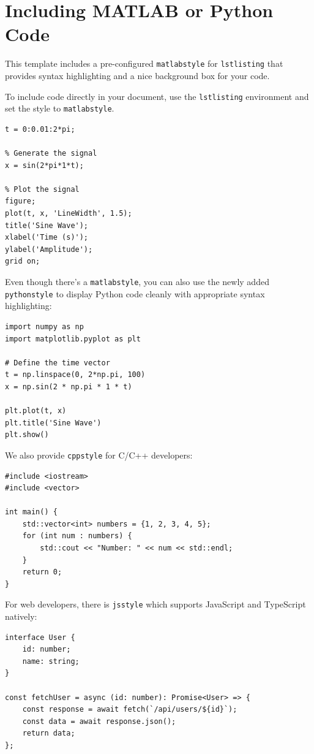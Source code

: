 \section{Including MATLAB or Python Code}

This template includes a pre-configured \texttt{matlabstyle} for \texttt{lstlisting} that provides syntax highlighting and a nice background box for your code.

To include code directly in your document, use the \texttt{lstlisting} environment and set the style to \texttt{matlabstyle}.

\begin{lstlisting}[style=matlabstyle, caption={A simple MATLAB script to plot a sine wave.}]
% Define the time vector
t = 0:0.01:2*pi;

% Generate the signal
x = sin(2*pi*1*t);

% Plot the signal
figure;
plot(t, x, 'LineWidth', 1.5);
title('Sine Wave');
xlabel('Time (s)');
ylabel('Amplitude');
grid on;
\end{lstlisting}

Even though there's a \texttt{matlabstyle}, you can also use the newly added \texttt{pythonstyle} to display Python code cleanly with appropriate syntax highlighting:

\begin{lstlisting}[style=pythonstyle, caption={A simple Python script.}]
import numpy as np
import matplotlib.pyplot as plt

# Define the time vector
t = np.linspace(0, 2*np.pi, 100)
x = np.sin(2 * np.pi * 1 * t)

plt.plot(t, x)
plt.title('Sine Wave')
plt.show()
\end{lstlisting}

We also provide \texttt{cppstyle} for C/C++ developers:

\begin{lstlisting}[style=cppstyle, caption={A simple C++ program.}]
#include <iostream>
#include <vector>

int main() {
    std::vector<int> numbers = {1, 2, 3, 4, 5};
    for (int num : numbers) {
        std::cout << "Number: " << num << std::endl;
    }
    return 0;
}
\end{lstlisting}

For web developers, there is \texttt{jsstyle} which supports JavaScript and TypeScript natively:

\begin{lstlisting}[style=jsstyle, caption={A modern TypeScript function.}]
interface User {
    id: number;
    name: string;
}

const fetchUser = async (id: number): Promise<User> => {
    const response = await fetch(`/api/users/${id}`);
    const data = await response.json();
    return data;
};
\end{lstlisting}

